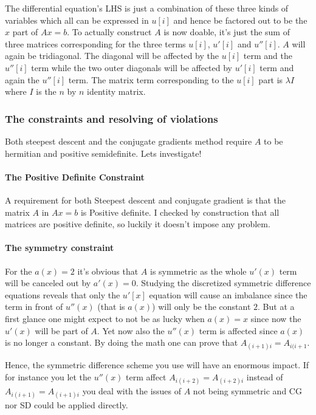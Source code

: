 \documentclass[a4paper,11pt]{article}
\begin{document}
The differential equation's LHS is just a combination of these
three kinds of variables which all can be expressed in $u[i]$ and
hence be factored out to be the $x$ part of $Ax=b$. To actually
construct $A$ is now doable, it's just the sum of three matrices
corresponding for the three terms $u[i]$, $u'[i]$ and $u''[i]$. $A$ will
again be tridiagonal. The diagonal will be affected by the $u[i]$ term
and the $u''[i]$ term while the two outer diagonals will be affected by
$u'[i]$ term and again the $u''[i]$ term. The matrix term corresponding
to the $u[i]$ part is $\lambda I$ where $I$ is the $n$ by $n$ identity
matrix.

\subsubsection{The constraints and resolving of violations}

Both steepest descent and the conjugate gradients method require
$A$ to be hermitian and positive semidefinite. Lets investigate!

\paragraph{The Positive Definite Constraint}

A requirement for both Steepest descent and conjugate gradient is that
the matrix $A$ in $Ax=b$ is Positive definite. I checked by construction
that all matrices are positive definite, so luckily it doesn't impose
any problem.

\paragraph{The symmetry constraint}

For the $a(x) = 2$ it's obvious that $A$ is symmetric as the whole
$u'(x)$ term will be canceled out by $a'(x) = 0$. Studying the
discretized symmetric difference equations reveals that only the $u'[x]$
equation will cause an imbalance since the term in front of $u''(x)$
(that is $a(x)$) will only be the constant $2$. But at a first glance
one might expect to not be as lucky when $a(x) = x$ since now the
$u'(x)$ will be part of $A$.  Yet now also the $u''(x)$ term is affected
since $a(x)$ is no longer a constant. By doing the math one can prove
that $A_{(i+1)i} = A_{i(i+1}$.

Hence, the symmetric difference scheme you use will have an enormous
impact. If for instance you let the $u''(x)$ term affect
$A_{i(i+2)}=A_{(i+2)i}$ instead of $A_{i(i+1)}=A_{(i+1)i}$ you deal with
the issues of $A$ not being symmetric and CG nor SD could be applied
directly.
\end{document}
